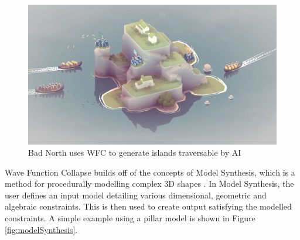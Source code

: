 \begin{figure}[H]
        \centering
        \includegraphics[width=\textwidth, height=0.3\textheight, keepaspectratio]{Images/BadNorth.jpg}
        \caption{Bad North uses WFC to generate islands traversable by AI \cite{badnorth}}
        \label{fig:badNorth}
\end{figure}

Wave Function Collapse builds off of the concepts of Model Synthesis, which is a method for procedurally modelling complex 3D shapes \cite{model_synthesis, model_synthesis_diss}. In Model Synthesis, the user defines an input model detailing various dimensional, geometric and algebraic constraints. This is then used to create output satisfying the modelled constraints. A simple example using a pillar model is shown in Figure \ref{fig:modelSynthesis}.


